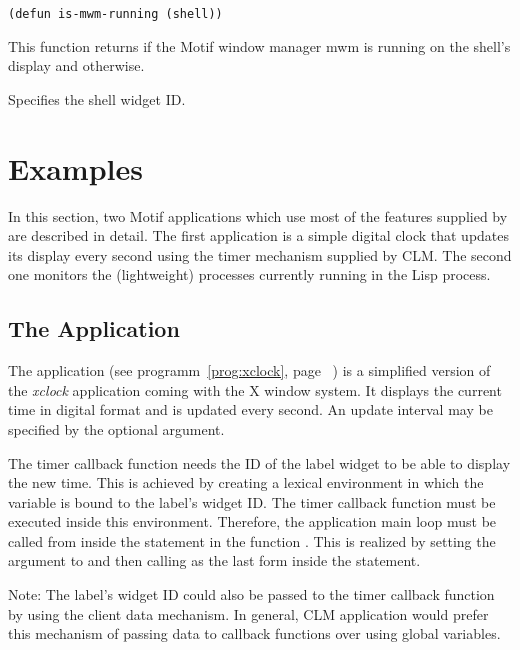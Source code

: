 \begin{lispd}
\syntax\begin{verbatim}
(defun is-mwm-running (shell))
\end{verbatim}
\beschr This function returns  if the Motif window manager mwm
is running on the shell's display and  otherwise.
\begin{paramd}
 Specifies the shell widget ID.
\end{paramd}
\end{lispd}

\section{Examples}

In this section, two Motif applications which use most of the features
supplied by  are described in detail. The first
application is a simple digital clock that updates its display every second
using the timer mechanism supplied by CLM. The second one monitors the
(lightweight) processes currently running in the Lisp process.

\subsection{The Application }\label{ex:xclock}

The  application (see programm~\ref{prog:xclock}, page
~\pageref{prog:xclock}) is a simplified version of the {\it xclock} application
coming with the X window system.  It displays the current time in digital format
and is updated every second.  An update interval may be specified by the
optional  argument. 

The timer callback function needs the ID of the label widget to be able to
display the new time. This is achieved by creating a lexical environment in
which the variable  is bound to the label's widget ID. The
timer callback function must be executed inside this environment. Therefore, the
application main loop must be called from inside the  statement in
the function . This is realized by setting the 
 argument to  and then calling
 as the last form inside the  statement. 

Note: The label's widget ID could also be passed to the timer callback function
by using the client data mechanism.  In general, CLM application would prefer
this mechanism of passing data to callback functions over using global
variables. 

